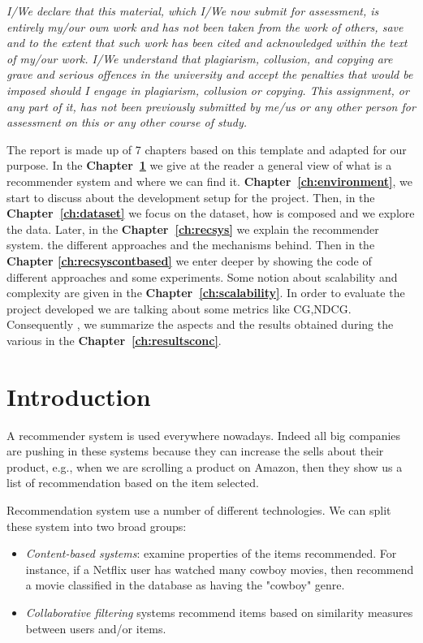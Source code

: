 \documentclass[12pt,english]{report}
\begin{document}
\frontespizio
{\raggedleft \large \sl \textit{I/We declare that this material, which I/We now submit for assessment, is entirely my/our own work and has not been taken from the work of others, save and to the extent that such work has been cited and acknowledged within the text of my/our work. I/We understand that plagiarism, collusion, and copying are grave and serious offences in the university and accept the penalties that would be imposed should I engage in plagiarism, collusion or copying. This assignment, or any part of it, has not been previously submitted by me/us or any other person for assessment on this or any other course of study.} \\}


\afterpreface

The report is made up of 7 chapters based on this template\cite{latextemp} and adapted for our purpose. In the \textbf{Chapter~\ref{ch:introduction}} we give at the reader a general view of what is a recommender system and where we can find it.
\textbf{Chapter~\ref{ch:environment}}, we start to discuss about the development setup for the project. Then, in the \textbf{Chapter~\ref{ch:dataset}} we focus on the dataset, how is composed and we explore the data. Later, in the \textbf{Chapter~\ref{ch:recsys}} we explain the recommender system. the different approaches and the mechanisms behind. Then in the \textbf{Chapter \ref{ch:recsyscontbased}} we enter deeper by showing the code of different approaches and some experiments. Some notion about scalability and complexity are given in the \textbf{Chapter~\ref{ch:scalability}}. In order to evaluate the project developed we are talking about some metrics like CG,NDCG. Consequently , we summarize the aspects and the results obtained during the various  in the \textbf{Chapter~\ref{ch:resultsconc}}.

\chapter{Introduction}\label{ch:introduction}
A recommender system is used everywhere nowadays. Indeed all big companies are pushing in these systems because they can increase the sells about their product, e.g., when we are scrolling a product on Amazon, then they show us a list of recommendation based on the item selected.\par

Recommendation system use a number of different technologies. We can split these system into two broad groups: \cite{rajaraman2014mining}
\begin{itemize}
\item \textit{Content-based systems}: examine properties of the items recommended. For instance, if a Netflix user has watched many cowboy movies, then recommend a movie classified in the database as having the "cowboy" genre.
\item \textit{Collaborative filtering} systems recommend items based on similarity measures between users and/or items.
\end{itemize}
\end{document}
